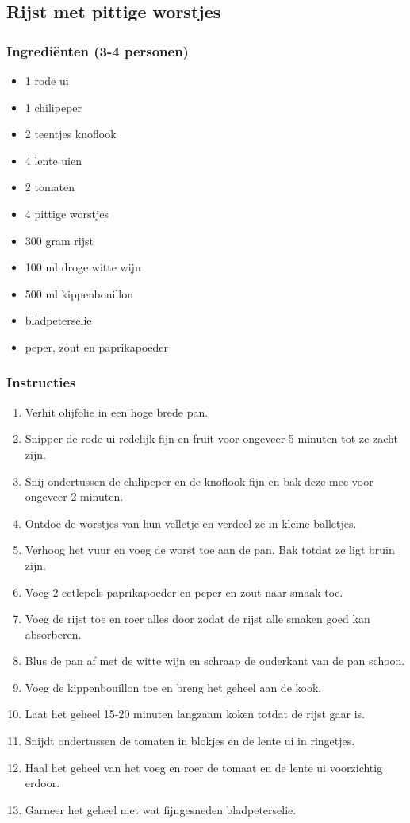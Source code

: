 \subsection{Rijst met pittige worstjes}

\subsubsection*{Ingrediënten (3-4 personen)}
\begin{multicols}{2}
    \begin{itemize}
        \item 1 rode ui
        \item 1 chilipeper
        \item 2 teentjes knoflook
        \item 4 lente uien
        \item 2 tomaten
        \item 4 pittige worstjes
        \item 300 gram rijst
        \item 100 ml droge witte wijn
        \item 500 ml kippenbouillon
        \item bladpeterselie
        \item peper, zout en paprikapoeder
    \end{itemize}
\end{multicols}


\subsubsection*{Instructies}
\begin{enumerate}
    \item Verhit olijfolie in een hoge brede pan.
    \item Snipper de rode ui redelijk fijn en fruit voor ongeveer 5 minuten tot ze zacht zijn.
    \item Snij ondertussen de chilipeper en de knoflook fijn en bak deze mee voor ongeveer 2 minuten.
    \item Ontdoe de worstjes van hun velletje en verdeel ze in kleine balletjes.
    \item Verhoog het vuur en voeg de worst toe aan de pan. Bak totdat ze ligt bruin zijn.
    \item Voeg 2 eetlepels paprikapoeder en peper en zout naar smaak toe.
    \item Voeg de rijst toe en roer alles door zodat de rijst alle smaken goed kan absorberen.
    \item Blus de pan af met de witte wijn en schraap de onderkant van de pan schoon.
    \item Voeg de kippenbouillon toe en breng het geheel aan de kook.
    \item Laat het geheel 15-20 minuten langzaam koken totdat de rijst gaar is.
    \item Snijdt ondertussen de tomaten in blokjes en de lente ui in ringetjes.
    \item Haal het geheel van het voeg en roer de tomaat en de lente ui voorzichtig erdoor.
    \item Garneer het geheel met wat fijngesneden bladpeterselie.
\end{enumerate}